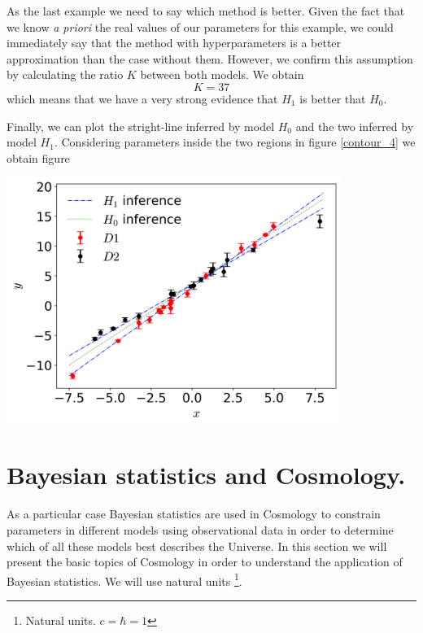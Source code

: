 \documentclass[onecolumn,           %
               showpacs,            %
               preprintnumbers,     %
               aps,                 %
               letterpaper,             %
               superscriptaddress,      %
               nofootinbib,         %
               tightenlines,        %
               floats,floatfix      %
               ,usenatbib,
               ]{revtex4-1}
\begin{document}
As the last example we need to say which method is better. Given the fact that we know \textit{a priori} the real values of our parameters for this example, we could immediately say that the method with hyperparameters is a better approximation than the case without them. However, we confirm this assumption by calculating the ratio $K$ between both models. We obtain
\begin{equation}
K = 37
\end{equation}
which means that we have a very strong evidence that $H_1$ is better that $H_0$.

Finally, we can plot the stright-line inferred by model $H_0$ and the two inferred by model $H_1$. Considering parameters inside the two regions in figure \eqref{contour_4} we obtain figure 
\\

\begin{minipage}{\textwidth}
\centering
\includegraphics[height=8cm]{Figures/stright2.png}
\label{contour_4}
\end{minipage}

\section{Bayesian statistics and Cosmology.}

As a particular case Bayesian statistics are used in Cosmology to constrain parameters in different models using observational data in order to determine which of all these models best describes the Universe. In this section we will present the basic topics of Cosmology in order to understand the application of Bayesian statistics. We will use natural units \footnote{Natural units. $c=\hbar=1$}.
\end{document}
